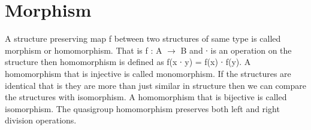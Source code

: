 \section{Morphism}
A structure preserving map f between two structures of same type is called morphism or homomorphism. That is f : A \(\rightarrow\) B and ∙ is an operation on the structure then homomorphism is defined as f(x ∙ y) = f(x) ∙ f(y). A homomorphism that is injective is called monomorphism. If the structures are identical that is they are more than just similar in structure then we can compare the structures with isomorphism. A homomorphism that is bijective is called isomorphism. 
The quasigroup homomorphism preserves both left and right division operations.
\begin{comment}
module QuasigroupMorphisms (Q\textsubscript{1} : RawQuasigroup a ℓ\textsubscript{1}) (Q\textsubscript{2} : RawQuasigroup b ℓ\textsubscript{2}) where

  open RawQuasigroup Q\textsubscript{1} renaming (Carrier to A; ∙-rawMagma to ∙-rawMagma\textsubscript{1};
                                  \textbackslash\textbackslash-rawMagma to \textbackslash\textbackslash-rawMagma\textsubscript{1}; //-rawMagma to //-rawMagma\textsubscript{1};
                                  _≈_ to _≈\textsubscript{1}_; _∙_ to _∙\textsubscript{1}_; _\textbackslash\textbackslash_ to _\textbackslash\textbackslash\textsubscript{1}_; _//_ to _//\textsubscript{1}_)
  open RawQuasigroup Q\textsubscript{2} renaming (Carrier to B; ∙-rawMagma to ∙-rawMagma\textsubscript{2};
                                  \textbackslash\textbackslash-rawMagma to \textbackslash\textbackslash-rawMagma\textsubscript{2}; //-rawMagma to //-rawMagma\textsubscript{2};
                                  _≈_ to _≈\textsubscript{2}_; _∙_ to _∙\textsubscript{2}_; _\textbackslash\textbackslash_ to _\textbackslash\textbackslash\textsubscript{2}_; _//_ to _//\textsubscript{2}_)

  module ∙  = MagmaMorphisms ∙-rawMagma\textsubscript{1} ∙-rawMagma\textsubscript{2}
  module \textbackslash\textbackslash = MagmaMorphisms \textbackslash\textbackslash-rawMagma\textsubscript{1} \textbackslash\textbackslash-rawMagma\textsubscript{2}
  module // = MagmaMorphisms //-rawMagma\textsubscript{1} //-rawMagma\textsubscript{2}

  open MorphismDefinitions A B _≈\textsubscript{2}_
  open FunctionDefinitions _≈\textsubscript{1}_ _≈\textsubscript{2}_
\end{comment}
